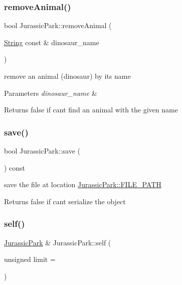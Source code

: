 \subsubsection{\texorpdfstring{remove\+Animal()}{removeAnimal()}}
{\footnotesize\ttfamily bool Jurassic\+Park\+::remove\+Animal (\begin{DoxyParamCaption}\item[{\hyperlink{classString}{String} const \&}]{dinosaur\+\_\+name }\end{DoxyParamCaption})}

remove an animal (dinosaur) by its name 
\begin{DoxyParams}{Parameters}
{\em dinosaur\+\_\+name} & \\
\hline
\end{DoxyParams}
\begin{DoxyReturn}{Returns}
false if can\textquotesingle{}t find an animal with the given name 
\end{DoxyReturn}
\mbox{\label{classJurassicPark_a89a93a8592bad0dbfd3862bb404f6b80}} 
\subsubsection{\texorpdfstring{save()}{save()}}
{\footnotesize\ttfamily bool Jurassic\+Park\+::save (\begin{DoxyParamCaption}{ }\end{DoxyParamCaption}) const}

save the file at location \hyperlink{classJurassicPark_a0997428c12ee5be9fb69c87415cab85b}{Jurassic\+Park\+::\+F\+I\+L\+E\+\_\+\+P\+A\+TH} \begin{DoxyReturn}{Returns}
false if can\textquotesingle{}t serialize the object 
\end{DoxyReturn}
\mbox{\label{classJurassicPark_ae6cd7ff3eaec5f2e52b7dab2dfb7b5df}} 
\subsubsection{\texorpdfstring{self()}{self()}}
{\footnotesize\ttfamily \hyperlink{classJurassicPark}{Jurassic\+Park} \& Jurassic\+Park\+::self (\begin{DoxyParamCaption}\item[{unsigned}]{limit = {} }\end{DoxyParamCaption})\hspace{0.3cm}{\ttfamily [static]}}

